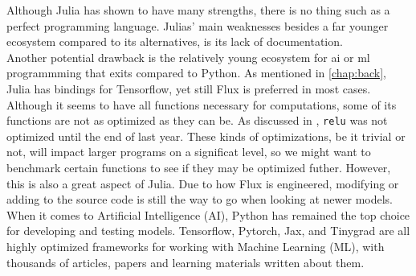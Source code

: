 
Although Julia has shown to have many strengths, there is no thing such as a perfect programming language. Julias' main weaknesses besides a far younger ecosystem compared to its alternatives, is its lack of documentation. \\

Another potential drawback is the relatively young ecosystem for \acrshort{ai} or \acrshort{ml} programmming that exits compared to Python. As mentioned in \ref{chap:back}, Julia has bindings for Tensorflow, yet still Flux is preferred in most cases. Although it seems to have all functions necessary for computations, some of its functions are not as optimized as they can be. As discussed in \cite{projthesis}, \lstinline|relu| was not optimized until the end of last year. These kinds of optimizations, be it trivial or not, will impact larger programs on a significat level, so we might want to benchmark certain functions to see if they may be optimized futher. However, this is also a great aspect of Julia. Due to how Flux is engineered, modifying or adding to the source code is still the way to go when looking at newer models. \\

When it comes to Artificial Intelligence (AI), Python has remained the top choice for developing and testing models. Tensorflow, Pytorch, Jax, and Tinygrad are all highly optimized frameworks for working with Machine Learning (ML), with thousands of articles, papers and learning materials written about them.

